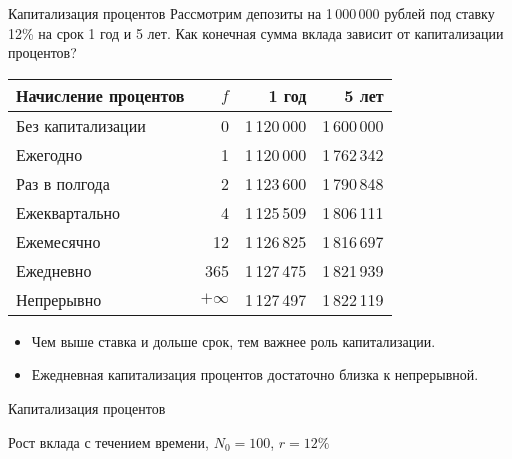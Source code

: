 \documentclass{beamer}
\begin{document}
\begin{frame}{Капитализация процентов}
\justify
Рассмотрим депозиты на 1\,000\,000 рублей под ставку 12\% на срок 1 год и 5 лет. 
Как конечная сумма вклада зависит от капитализации процентов?


\begin{table}
\centering
\begin{tabular}{l|r|r|r}
Начисление процентов & $f$ & 1 год & 5 лет \\ \hline
Без капитализации & 0         & 1\,120\,000 & 1\,600\,000 \\
Ежегодно          & 1         & 1\,120\,000 & 1\,762\,342 \\
Раз в полгода     & 2         & 1\,123\,600 & 1\,790\,848 \\
Ежеквартально     & 4         & 1\,125\,509 & 1\,806\,111 \\
Ежемесячно        & 12        & 1\,126\,825 & 1\,816\,697 \\
Ежедневно         & 365       & 1\,127\,475 & 1\,821\,939 \\
Непрерывно        & $+\infty$ & 1\,127\,497 & 1\,822\,119
\end{tabular}
\end{table}

\justifying
\vspace{\baselineskip}
\begin{itemize}
\justifying
\item Чем выше ставка и дольше срок, тем важнее роль капитализации.
\item Ежедневная капитализация процентов достаточно близка к непрерывной.
\end{itemize}
\end{frame}



\begin{frame}{Капитализация процентов}

	\centering
	\scriptsize{Рост вклада с течением времени, $N_0=100$, $r=12\%$}
\end{frame}
\end{document}
